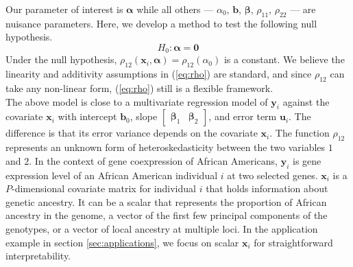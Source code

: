 \documentclass[aap,authoryear, preprint]{imsart}
\numberwithin{equation}{section}
\theoremstyle{plain}
\begin{document}
Our parameter of interest is $\bm{\alpha}$ while all others --- $\alpha_0$, $\bm{b}$, $\bm{\beta}$, $\rho_{11}$, $\rho_{22}$ --- are nuisance parameters. Here, we develop a method to test the following null hypothesis.
\begin{equation}
    H_0: \bm{\alpha} = \bm{0}
    \label{eq:null}
\end{equation}
Under the null hypothesis, $\rho_{12}(\bm{x}_i, \bm{\alpha}) = \rho_{12}(\alpha_0)$ is a constant. We believe the linearity and additivity assumptions in (\ref{eq:rho}) are standard, and since $\rho_{12}$ can take any non-linear form, (\ref{eq:rho}) still is a flexible framework. \\

The above model is close to a multivariate regression model of $\bm{y}_i$ against the covariate $\bm{x}_i$ with intercept $\bm{b}_0$, slope $\begin{bmatrix} \bm{\beta}_1 & \bm{\beta}_2 \end{bmatrix}$, and error term $\bm{u}_i$. The difference is that its error variance depends on the covariate $\bm{x}_i$. The function $\rho_{12}$ represents an unknown form of heteroskedasticity between the two variables $1$ and $2$. In the context of gene coexpression of African Americans, $\bm{y}_i$ is gene expression level of an African American individual $i$ at two selected genes. $\bm{x}_i$ is a $P$-dimensional covariate matrix for individual $i$ that holds information about genetic ancestry. It can be a scalar that represents the proportion of African ancestry in the genome, a vector of the first few principal components of the genotypes, or a vector of local ancestry at multiple loci. In the application example in section \ref{sec:applications}, we focus on scalar $\bm{x}_i$ for straightforward interpretability. \\
\end{document}
